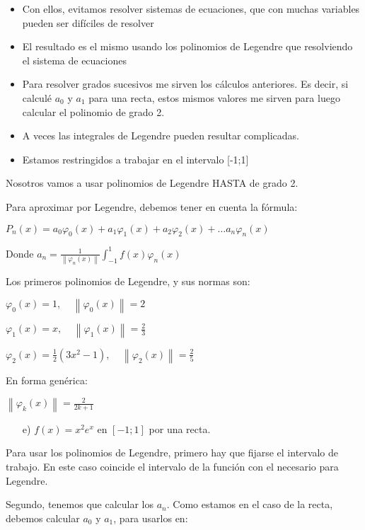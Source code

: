 \documentclass[11pt]{article}
\begin{document}
	\begin{itemize}
		\item Con ellos, evitamos resolver sistemas de ecuaciones, que con muchas variables pueden ser difíciles de resolver
		\item El resultado es el mismo usando los polinomios de Legendre que resolviendo el sistema de ecuaciones
		\item Para resolver grados sucesivos me sirven los cálculos anteriores. Es decir, si calculé $a_0$ y $a_1$ para una recta, estos mismos valores me sirven para luego calcular el polinomio de grado 2.
		\item A veces las integrales de Legendre pueden resultar complicadas.
		\item Estamos restringidos a trabajar en el intervalo [-1;1]
	\end{itemize}

	Nosotros vamos a usar polinomios de Legendre HASTA de grado 2.
	
	Para aproximar por Legendre, debemos tener en cuenta la fórmula:
	
	$P_n(x)=a_0 \varphi_0(x)+a_1 \varphi_1(x)+a_2 \varphi_2(x)+\dots a_n\varphi_n(x)$
	
	Donde $\displaystyle a_n=\frac{1}{\left\lVert \varphi_n(x) \right\rVert}\int_{-1}^{1}f(x)\varphi_n(x)$
	
	Los primeros polinomios de Legendre, y sus normas son:
	
	$\displaystyle \varphi_0(x)=1, \;\;\;\; \left\lVert\varphi_0(x) \right\rVert=2$
	
	$\displaystyle \varphi_1(x)=x, \;\;\;\; \left\lVert\varphi_1(x) \right\rVert=\frac{2}{3}$
	
	$\displaystyle \varphi_2(x)=\frac{1}{2}(3x^2-1), \;\;\;\; \left\lVert\varphi_2(x) \right\rVert=\frac{2}{5}$
	
	En forma genérica:
	
	$\displaystyle \left\lVert\varphi_k(x) \right\rVert=\frac{2}{2k+1}$\\
	
	\begin{itemize}
		\item[e)] $f(x)=x^2e^x$ en $[-1;1]$ por una recta.
	\end{itemize}

	Para usar los polinomios de Legendre, primero hay que fijarse el intervalo de trabajo. En este caso coincide el intervalo de la función con el necesario para Legendre.
	
	Segundo, tenemos que calcular los $a_n$. Como estamos en el caso de la recta, debemos calcular $a_0$ y $a_1$, para usarlos en:
	
\end{document}
